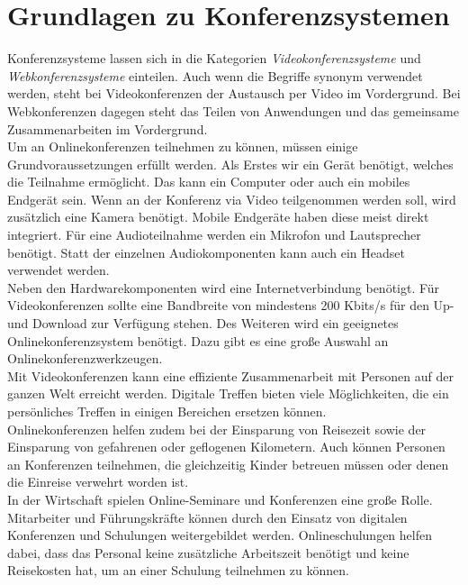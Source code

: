 \section{Grundlagen zu Konferenzsystemen}
Konferenzsysteme lassen sich in die Kategorien \textit{Videokonferenzsysteme} und \textit{Webkonferenzsysteme} einteilen.
\autocite[Vgl.][]{M_Straub.o.J.}
Auch wenn die Begriffe synonym verwendet werden, steht bei Videokonferenzen der Austausch per Video im Vordergrund.
Bei Webkonferenzen dagegen steht das Teilen von Anwendungen und das gemeinsame Zusammenarbeiten im Vordergrund.
\autocite[Vgl.][]{M_Straub.o.J.}
\\
Um an Onlinekonferenzen teilnehmen zu können, müssen einige Grundvoraussetzungen erfüllt werden.
Als Erstes wir ein Gerät benötigt, welches die Teilnahme ermöglicht.
Das kann ein Computer oder auch ein mobiles Endgerät sein.
Wenn an der Konferenz via Video teilgenommen werden soll, wird zusätzlich eine Kamera benötigt.
Mobile Endgeräte haben diese meist direkt integriert.
Für eine Audioteilnahme werden ein Mikrofon und Lautsprecher benötigt.
Statt der einzelnen Audiokomponenten kann auch ein Headset verwendet werden.
\autocite[Vgl.][]{M_Straub.o.J.}
\\
Neben den Hardwarekomponenten wird eine Internetverbindung benötigt.
Für Videokonferenzen sollte eine Bandbreite von mindestens 200 Kbits/s für den Up- und Download zur Verfügung stehen.
Des Weiteren wird ein geeignetes Onlinekonferenzsystem benötigt.
Dazu gibt es eine große Auswahl an Onlinekonferenzwerkzeugen.
\autocite[Vgl.][]{M_Straub.o.J.}
\\
Mit Videokonferenzen kann eine effiziente Zusammenarbeit mit Personen auf der ganzen Welt erreicht werden.
Digitale Treffen bieten viele Möglichkeiten, die ein persönliches Treffen in einigen Bereichen ersetzen können.
\autocite[Vgl.][]{M_Mierke.2020}
\\
Onlinekonferenzen helfen zudem bei der Einsparung von Reisezeit sowie der Einsparung von gefahrenen oder geflogenen Kilometern.
Auch können Personen an Konferenzen teilnehmen, die gleichzeitig Kinder betreuen müssen oder denen die Einreise verwehrt worden ist.
\autocite[Vgl.][]{M_Sladek.2020}
\\
In der Wirtschaft spielen Online-Seminare und Konferenzen eine große Rolle.
Mitarbeiter und Führungskräfte können durch den Einsatz von digitalen Konferenzen und Schulungen weitergebildet werden.
Onlineschulungen helfen dabei, dass das Personal keine zusätzliche Arbeitszeit benötigt und keine Reisekosten hat, um an einer Schulung teilnehmen zu können.
